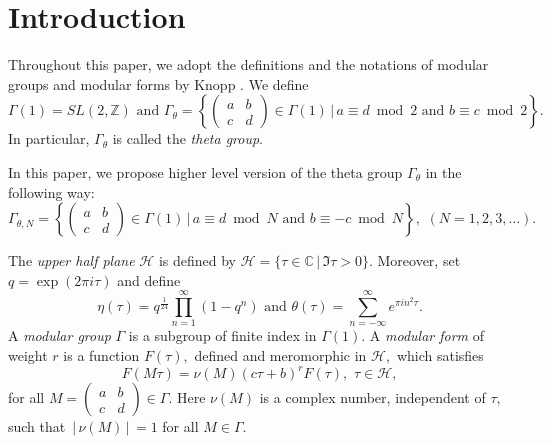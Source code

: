 \documentclass[12pt]{article}
\theoremstyle{definition}
\numberwithin{equation}{section}
\numberwithin{theorem}{section}
\begin{document}
\section{Introduction}
\label{intro}
Throughout this paper, 
we adopt the definitions and the notations of modular groups and modular forms by Knopp \cite{Knopp}. 
We define 
\begin{equation*}
\Gamma(1)=SL(2,\mathbb{Z}) \,\,
\mathrm{and} \,\,
\Gamma_{\theta}=
\left\{
\begin{pmatrix}
a & b \\
c & d
\end{pmatrix}
\in
\Gamma(1) \,\Big| \,
a\equiv d  \bmod{2} \,\,
\mathrm{and} \,\,
b \equiv c  \bmod{2} 
\right\}.
\end{equation*}
In particular, 
$\Gamma_{\theta}$ is called the {\it theta group}. 
\par
In this paper, we  propose higher level version of the theta group $\Gamma_{\theta}$ in the following way: 
\begin{equation*}
\Gamma_{\theta,N}
=
\left\{
\begin{pmatrix}
a & b \\
c & d
\end{pmatrix}
\in
\Gamma(1) \,\Big| \,
a\equiv d  \bmod{N} \,\,
\mathrm{and} \,\,
b \equiv -c  \bmod{N} 
\right\}, \,\,
(N=1,2,3,\ldots).
\end{equation*}
\par
The {\it upper half plane} $\mathscr{H}$ is defined by 
$
\mathscr{H}=
\{
\tau\in\mathbb{C} \, | \,  \Im \tau>0
\}. 
$
Moreover, set $q=\exp(2\pi i  \tau)$ and define 
\begin{equation*}
\displaystyle
\eta(\tau)=q^{\frac{1}{24}} \prod_{n=1}^{\infty} (1-q^n) 
\,\,\mathrm{and} \,\,
\theta(\tau)=\sum_{n=-\infty}^{\infty}  e^{\pi i n^2 \tau}.  
\end{equation*}
A {\it modular group} $\Gamma$ is a subgroup of finite index in $\Gamma(1).$ 
A {\it modular form} of weight $r$ is a function $F(\tau),$ 
defined and meromorphic in $\mathscr{H},$ 
which satisfies 
\begin{equation*}
F(M\tau)
=
\nu(M)
(c \tau+b)^r F(\tau), \,\,\tau\in \mathscr{H},
\end{equation*}
for all 
$
M
=
\begin{pmatrix}
a & b \\
c & d
\end{pmatrix}
\in \Gamma.
$
Here $\nu(M)$ is a complex number, independent of $\tau,$ such that $\,| \,\nu(M)\,| \,=1$ for all $M\in\Gamma.$ 
\end{document}
